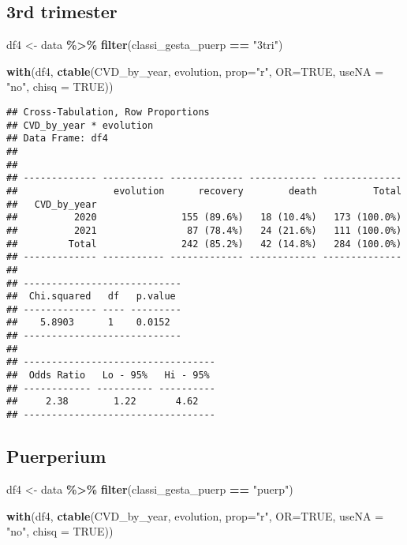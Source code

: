 \documentclass[
]{article}
\newenvironment{Shaded}{\begin{snugshade}}{\end{snugshade}}
\newcommand{\AttributeTok}[1]{\textcolor[rgb]{0.13,0.29,0.53}{#1}}
\newcommand{\ConstantTok}[1]{\textcolor[rgb]{0.56,0.35,0.01}{#1}}
\newcommand{\FunctionTok}[1]{\textcolor[rgb]{0.13,0.29,0.53}{\textbf{#1}}}
\newcommand{\NormalTok}[1]{#1}
\newcommand{\OtherTok}[1]{\textcolor[rgb]{0.56,0.35,0.01}{#1}}
\newcommand{\SpecialCharTok}[1]{\textcolor[rgb]{0.81,0.36,0.00}{\textbf{#1}}}
\newcommand{\StringTok}[1]{\textcolor[rgb]{0.31,0.60,0.02}{#1}}
\begin{document}
\hypertarget{rd-trimester-8}{%
\subsection{3rd trimester}\label{rd-trimester-8}}

\begin{Shaded}
\begin{Highlighting}[]
\NormalTok{df4 }\OtherTok{\textless{}{-}}\NormalTok{ data }\SpecialCharTok{\%\textgreater{}\%} 
  \FunctionTok{filter}\NormalTok{(classi\_gesta\_puerp }\SpecialCharTok{==} \StringTok{"3tri"}\NormalTok{)}

\FunctionTok{with}\NormalTok{(df4, }\FunctionTok{ctable}\NormalTok{(CVD\_by\_year, evolution, }\AttributeTok{prop=}\StringTok{"r"}\NormalTok{, }\AttributeTok{OR=}\ConstantTok{TRUE}\NormalTok{, }\AttributeTok{useNA =} \StringTok{"no"}\NormalTok{, }\AttributeTok{chisq =} \ConstantTok{TRUE}\NormalTok{))}
\end{Highlighting}
\end{Shaded}

\begin{verbatim}
## Cross-Tabulation, Row Proportions  
## CVD_by_year * evolution  
## Data Frame: df4  
## 
## 
## ------------- ----------- ------------- ------------ --------------
##                 evolution      recovery        death          Total
##   CVD_by_year                                                      
##          2020               155 (89.6%)   18 (10.4%)   173 (100.0%)
##          2021                87 (78.4%)   24 (21.6%)   111 (100.0%)
##         Total               242 (85.2%)   42 (14.8%)   284 (100.0%)
## ------------- ----------- ------------- ------------ --------------
## 
## ----------------------------
##  Chi.squared   df   p.value 
## ------------- ---- ---------
##    5.8903      1    0.0152  
## ----------------------------
## 
## ----------------------------------
##  Odds Ratio   Lo - 95%   Hi - 95% 
## ------------ ---------- ----------
##     2.38        1.22       4.62   
## ----------------------------------
\end{verbatim}

\hypertarget{puerperium-8}{%
\subsection{Puerperium}\label{puerperium-8}}

\begin{Shaded}
\begin{Highlighting}[]
\NormalTok{df4 }\OtherTok{\textless{}{-}}\NormalTok{ data }\SpecialCharTok{\%\textgreater{}\%} 
  \FunctionTok{filter}\NormalTok{(classi\_gesta\_puerp }\SpecialCharTok{==} \StringTok{"puerp"}\NormalTok{)}

\FunctionTok{with}\NormalTok{(df4, }\FunctionTok{ctable}\NormalTok{(CVD\_by\_year, evolution, }\AttributeTok{prop=}\StringTok{"r"}\NormalTok{, }\AttributeTok{OR=}\ConstantTok{TRUE}\NormalTok{, }\AttributeTok{useNA =} \StringTok{"no"}\NormalTok{, }\AttributeTok{chisq =} \ConstantTok{TRUE}\NormalTok{))}
\end{Highlighting}
\end{Shaded}
\end{document}
